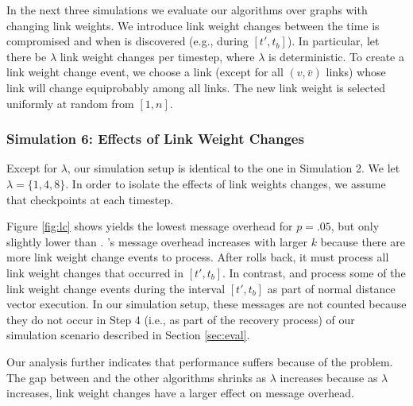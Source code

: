 In the next three simulations we evaluate our algorithms over graphs with changing link weights. We introduce link weight changes between the time \bad is compromised and when \bad is discovered 
(e.g., during $[t',t_b]$). 
In particular, let there be $\lambda$ link weight changes per timestep, where $\lambda$ is deterministic. 
To create a link weight change event, we choose a link (except for all $(v,\bar{v})$ links) whose link will change equiprobably among all links. 
The new link weight is selected uniformly at random from $[1,n]$. 

\subsubsection{Simulation 6: Effects of Link Weight Changes}

Except for $\lambda$, our simulation setup is identical to the one in Simulation 2. We let $\lambda = \{1,4,8\}$. In order to isolate the effects of link weights changes,
we assume that \cpr checkpoints at each timestep.

Figure \ref{fig:lc} shows \purge yields the lowest message overhead for $p=.05$, but only slightly lower than \cprs. 
\cprs's message overhead increases with larger $k$ because there are more link weight change events to process. After \cpr rolls back, it must process all link weight
changes that occurred in $[t',t_b]$. 
In contrast, \second and \purge process some of the link weight change events during the interval $[t',t_b]$ as part of normal distance vector execution. 
In our simulation setup, these messages are not counted because 
they do not occur in Step 4 (i.e., as part of the recovery process) of our simulation scenario described in Section \ref{sec:eval}.

Our analysis further indicates that \second performance suffers because of the \infinity problem. %
The gap between \second and the other algorithms shrinks as $\lambda$ increases because as $\lambda$ increases, link weight changes have a larger effect on message overhead.


